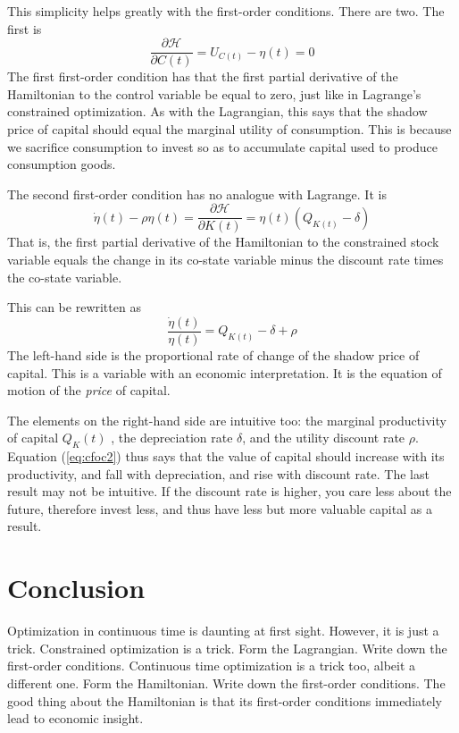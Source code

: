 This simplicity helps greatly with the first-order conditions. There are two. The first is
\begin{equation}
	\frac{\partial \mathcal{H} }{\partial C(t)} = U_{C(t)} - \eta (t) = 0
\end{equation}
The first first-order condition has that the first partial derivative of the Hamiltonian to the control variable be equal to zero, just like in Lagrange's constrained optimization. As with the Lagrangian, this says that the shadow price of capital should equal the marginal utility of consumption. This is because we sacrifice consumption to invest so as to accumulate capital used to produce consumption goods.

The second first-order condition has no analogue with Lagrange. It is
\begin{equation}
	\dot{\eta}(t) - \rho \eta(t) = \frac{\partial \mathcal{H} }{\partial K(t)} = \eta(t) \left ( Q_{K(t)}-\delta \right ) 
\end{equation}
That is, the first partial derivative of the Hamiltonian to the constrained stock variable equals the change in its co-state variable minus the discount rate times the co-state variable.

This can be rewritten as
\begin{equation}
\label{eq:cfoc2}
	\frac{\dot{\eta}(t)}{\eta(t)}  = Q_{K(t)} -\delta + \rho
\end{equation}
The left-hand side is the proportional rate of change of the shadow price of capital. This is a variable with an economic interpretation. It is the equation of motion of the \emph{price} of capital.

The elements on the right-hand side are intuitive too: the marginal productivity of capital $Q_K(t)$ , the depreciation rate $\delta$, and the utility discount rate $\rho$. Equation (\ref{eq:cfoc2}) thus says that the value of capital should increase with its productivity, and fall with depreciation, and rise with discount rate. The last result may not be intuitive. If the discount rate is higher, you care less about the future, therefore invest less, and thus have less but more valuable capital as a result.

\section{Conclusion}
Optimization in continuous time is daunting at first sight. However, it is just a trick. Constrained optimization is a trick. Form the Lagrangian. Write down the first-order conditions. Continuous time optimization is a trick too, albeit a different one. Form the Hamiltonian. Write down the first-order conditions. The good thing about the Hamiltonian is that its first-order conditions immediately lead to economic insight.